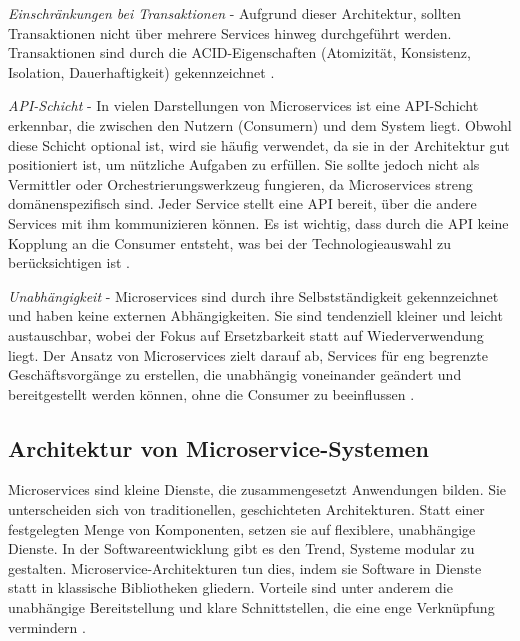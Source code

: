 {%
\textit{Einschränkungen bei Transaktionen} - Aufgrund dieser Architektur, sollten Transaktionen nicht über mehrere Services hinweg durchgeführt werden. Transaktionen sind durch die ACID-Eigenschaften (Atomizität, Konsistenz, Isolation, Dauerhaftigkeit) gekennzeichnet \cite[S.253]{richards} \cite[S. 2, 31-37]{wolff}.

\textit{API-Schicht} - In vielen Darstellungen von Microservices ist eine API-Schicht erkennbar, die zwischen den Nutzern (Consumern) und dem System liegt. Obwohl diese Schicht optional ist, wird sie häufig verwendet, da sie in der Architektur gut positioniert ist, um nützliche Aufgaben zu erfüllen. Sie sollte jedoch nicht als Vermittler oder Orchestrierungswerkzeug fungieren, da Microservices streng domänenspezifisch sind. Jeder Service stellt eine API bereit, über die andere Services mit ihm kommunizieren können. Es ist wichtig, dass durch die API keine Kopplung an die Consumer entsteht, was bei der Technologieauswahl zu berücksichtigen ist \cite[S.255,256]{richards} \cite[S.24]{newman}.

\textit{Unabhängigkeit} - Microservices sind durch ihre Selbstständigkeit gekennzeichnet und haben keine externen Abhängigkeiten. Sie sind tendenziell kleiner und leicht austauschbar, wobei der Fokus auf Ersetzbarkeit statt auf Wiederverwendung liegt. Der Ansatz von Microservices zielt darauf ab, Services für eng begrenzte Geschäftsvorgänge zu erstellen, die unabhängig voneinander geändert und bereitgestellt werden können, ohne die Consumer zu beeinflussen \cite[S.154-157]{sommerville} \cite[S.128]{dowalil} \cite[S.22,23]{newman}.

\pagebreak
\subsection{Architektur von Microservice-Systemen}

Microservices sind kleine Dienste, die zusammengesetzt Anwendungen bilden. Sie unterscheiden sich von traditionellen, geschichteten Architekturen. Statt einer festgelegten Menge von Komponenten, setzen sie auf flexiblere, unabhängige Dienste. In der Softwareentwicklung gibt es den Trend, Systeme modular zu gestalten. Microservice-Architekturen tun dies, indem sie Software in Dienste statt in klassische Bibliotheken gliedern. Vorteile sind unter anderem die unabhängige Bereitstellung und klare Schnittstellen, die eine enge Verknüpfung vermindern \cite[S.154-157]{sommerville} \cite{fowlerlewis}.

}
